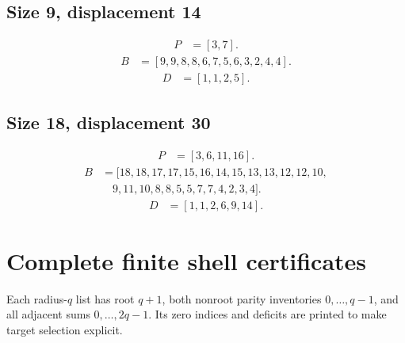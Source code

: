 \documentclass[11pt,a4paper]{article}
\theoremstyle{definition}\newtheorem{definition}[theorem]{Definition}
\theoremstyle{remark}\newtheorem{remark}[theorem]{Remark}
\begin{document}
\subsection*{Size 9, displacement 14}
\[\begin{aligned}
P&=[3,7].
\end{aligned}\]
\[\begin{aligned}
B&=[9,9,8,8,6,7,5,6,3,2,4,4].
\end{aligned}\]
\[\begin{aligned}
D&=[1,1,2,5].
\end{aligned}\]
\subsection*{Size 18, displacement 30}
\[\begin{aligned}
P&=[3,6,11,16].
\end{aligned}\]
\[\begin{aligned}
B&=[18,18,17,17,15,16,14,15,13,13,12,12,10,\\
&\quad 9,11,10,8,8,5,5,7,7,4,2,3,4].
\end{aligned}\]
\[\begin{aligned}
D&=[1,1,2,6,9,14].
\end{aligned}\]
\section{Complete finite shell certificates}\label{app:shells}
Each radius-$q$ list has root $q+1$, both nonroot parity inventories
$0,\ldots,q-1$, and all adjacent sums $0,\ldots,2q-1$. Its zero indices
and deficits are printed to make target selection explicit.
\end{document}
